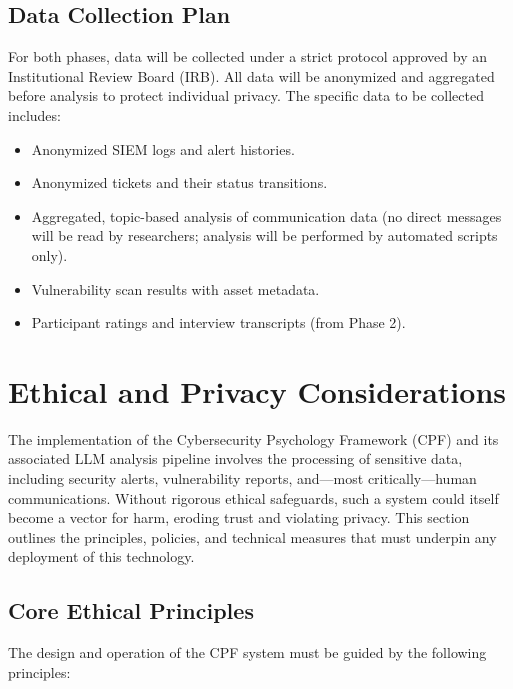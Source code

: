 \documentclass[11pt, a4paper]{article}
\begin{document}
\subsection{Data Collection Plan}
For both phases, data will be collected under a strict protocol approved by an Institutional Review Board (IRB). All data will be anonymized and aggregated before analysis to protect individual privacy. The specific data to be collected includes:
\begin{itemize}
    \item Anonymized SIEM logs and alert histories.
    \item Anonymized tickets and their status transitions.
    \item Aggregated, topic-based analysis of communication data (no direct messages will be read by researchers; analysis will be performed by automated scripts only).
    \item Vulnerability scan results with asset metadata.
    \item Participant ratings and interview transcripts (from Phase 2).
\end{itemize}

\section{Ethical and Privacy Considerations}
\label{sec:ethics}

The implementation of the Cybersecurity Psychology Framework (CPF) and its associated LLM analysis pipeline involves the processing of sensitive data, including security alerts, vulnerability reports, and—most critically—human communications. Without rigorous ethical safeguards, such a system could itself become a vector for harm, eroding trust and violating privacy. This section outlines the principles, policies, and technical measures that must underpin any deployment of this technology.

\subsection{Core Ethical Principles}
The design and operation of the CPF system must be guided by the following principles:
\end{document}
